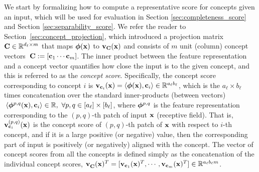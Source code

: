 We start by formalizing how to compute a representative score for concepts given an input, which will be used for evaluation in Section \ref{sec:completeness_score} and Section \ref{sec:separability_score}.
We refer the reader to Section~\ref{sec:concept_projection}, which introduced a projection matrix $\mathbf{C} \in \mathbb{R}^{d_\ell \times m}$ that maps $\bm{\phi}(\mathbf{x})$ to $\mathbf{v}_{\mathbf{C}}(\mathbf{x})$ and consists of $m$ unit (column) concept vectors $\,\mathbf{C} := [\mathbf{c}_1 \cdots \mathbf{c}_m]$. 
The inner product between the feature representation and a concept vector quantifies how close the input is to the given concept, and this is referred to as the {\em concept score}. 
Specifically, the concept score corresponding to concept $i$ is $\mathbf{v}_{\mathbf{c}_i}(\mathbf{x}) = \langle \bm{\phi}(\mathbf{x}), \mathbf{c}_i \rangle \in \mathbb{R}^{a_\ell b_\ell}$, which is the $a_\ell \times b_\ell$ times concatenation over the standard inner-products (between vectors) $\,\langle \bm{\phi}^{p,q}(\mathbf{x}), \mathbf{c}_i \rangle \in \mathbb{R}, ~\forall p, q \in [a_\ell] \times [b_\ell]$, where $\bm{\phi}^{p,q}$ is the feature representation corresponding to the $(p, q)$-th patch of input $\mathbf{x}$ (\ie receptive field).
That is, $\mathbf{v}_{\mathbf{c}_i}^{(p,q)}(\mathbf{x})$ is the concept score of $(p, q)$-th patch of $\mathbf{x}$ with respect to $i$-th concept, and if it is a large positive (or negative) value, then the corresponding part of input is positively (or negatively) aligned with the concept.
The vector of concept scores from all the concepts is defined simply as the concatenation of the individual concept scores, \ie $\mathbf{v}^{}_{\mathbf{C}}(\mathbf{x})^T = [\mathbf{v}_{\mathbf{c}_1}(\mathbf{x})^T, \cdots, \mathbf{v}_{\mathbf{c}_m}(\mathbf{x})^T] \in \mathbb{R}^{a_\ell b_\ell m}$.



